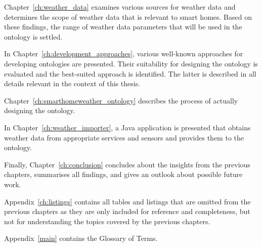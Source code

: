 Chapter~\ref{ch:weather_data} examines various sources for weather data and determines the scope of weather data that is relevant to smart homes. Based on these findings, the range of weather data parameters that will be used in the ontology is settled.

In Chapter~\ref{ch:development_approaches}, various well-known approaches for developing ontologies are presented. Their suitability for designing the \smarthomeweather ontology is evaluated and the best-suited approach is identified. The latter is described in all details relevant in the context of this thesis.

Chapter~\ref{ch:smarthomeweather_ontology} describes the process of actually designing the \smarthomeweather ontology.

In Chapter~\ref{ch:weather_importer}, a Java application is presented that obtains weather data from appropriate services and sensors and provides them to the \smarthomeweather ontology.

Finally, Chapter~\ref{ch:conclusion} concludes about the insights from the previous chapters, summarises all findings, and gives an outlook about possible future work.

Appendix~\ref{ch:listings} contains all tables and listings that are omitted from the previous chapters as they are only included for reference and completeness, but not for understanding the topics covered by the previous chapters.

Appendix~\ref{main} contains the Glossary of Terms.
